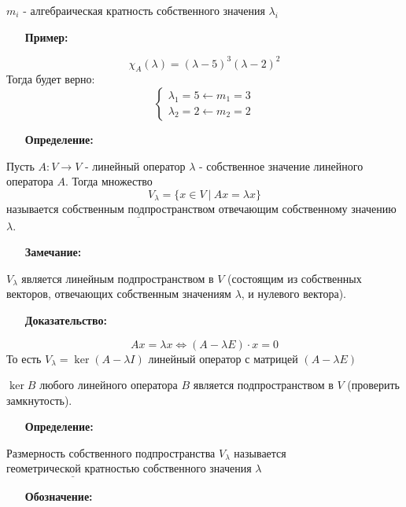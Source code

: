 \documentclass[12pt, letterpaper, twoside]{article}
\newcommand{\Underl}[1]{$\underline{\text{#1}}$}
\begin{document}
         $m_i$ - алгебраическая кратность собственного значения $\lambda_i$
         \begin{enumerate}
            \item[\textbf{Пример:}]
         \end{enumerate}
         \[\chi_A(\lambda) = (\lambda - 5)^3(\lambda - 2)^2\]
         Тогда будет верно:
         \[\begin{cases}
            \lambda_1 = 5\leftarrow m_1 = 3\\
            \lambda_2 = 2\leftarrow m_2 = 2
         \end{cases}\]
         \begin{enumerate}
            \item[\textbf{Определение:}]
         \end{enumerate}
         Пусть $A: V\rightarrow V$ - линейный оператор $\lambda$ - собственное значение линейного оператора $A$. Тогда множество
         \[V_{\lambda} = \{x\in V\ |\ Ax = \lambda x\}\]
         называется \Underl{собственным подпространством} отвечающим собственному значению $\lambda$.\newpage
         \begin{enumerate}
            \item[\textbf{Замечание:}]
         \end{enumerate}
         $V_{\lambda}$ является линейным подпространством в $V$ (состоящим из собственных векторов, отвечающих собственным значениям $\lambda$, и нулевого вектора).
         \begin{enumerate}
            \item[\textbf{Доказательство:}]
         \end{enumerate}
         \[Ax = \lambda x\Leftrightarrow (A - \lambda E)\cdot x = 0\]
         То есть $V_{\lambda} = \ker (A - \lambda I)$ линейный оператор с матрицей $(A - \lambda E)$\par
         $\ker B$ любого линейного оператора $B$ является подпространством в $V$ (проверить замкнутость).
         \begin{enumerate}
            \item[\textbf{Определение:}]
         \end{enumerate}
         Размерность собственного подпространства $V_{\lambda}$ называется \Underl{геометрической кратностью} собственного значения $\lambda$
         \begin{enumerate}
            \item[\textbf{Обозначение:}]
         \end{enumerate}
\end{document}
